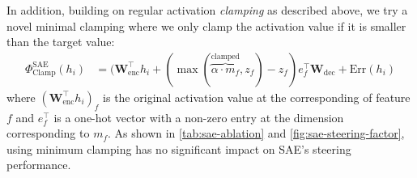 \documentclass{article}
\theoremstyle{plain}
\theoremstyle{definition}
\theoremstyle{remark}
\begin{document}
In addition, building on regular activation \textit{clamping} as described above, we try a novel minimal clamping where we only clamp the activation value if it is smaller than the target value:
\begin{align}
\Phi^{\text{SAE}}_{\text{Clamp}}(h_i) &= (\mathbf{W}_{\mathrm{enc}}^{\top}h_i + (\max(\overbrace{\alpha \cdot m_f}^{\text{clamped}}, z_f) - z_f)e_f^{\top}\mathbf{W}_{\mathrm{dec}} + \mathrm{Err}(h_i)
\end{align}
where $(\mathbf{W}_{\mathrm{enc}}^{\top}h_i)_{f}$ is the original activation value at the corresponding of feature $f$ and \( e_f^{\top} \) is a one-hot vector with a non-zero entry at the dimension corresponding to \( m_f \). As shown in \cref{tab:sae-ablation} and \cref{fig:sae-steering-factor}, using minimum clamping has no significant impact on SAE's steering performance.
\end{document}
